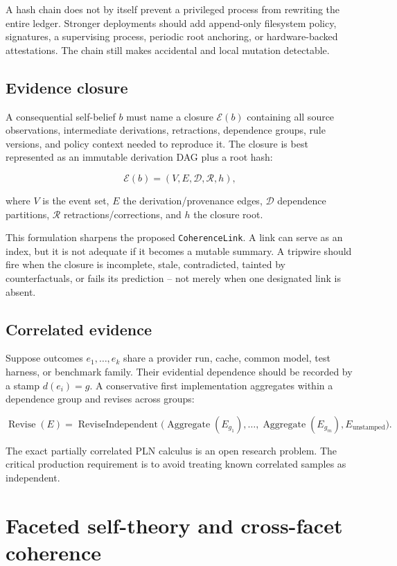 \documentclass[11pt,oneside]{report}
\begin{document}
A hash chain does not by itself prevent a privileged process from rewriting the entire ledger. Stronger deployments should add append-only filesystem policy, signatures, a supervising process, periodic root anchoring, or hardware-backed attestations. The chain still makes accidental and local mutation detectable.

\section{Evidence closure}

A consequential self-belief $b$ must name a closure $\mathcal{E}(b)$ containing all source observations, intermediate derivations, retractions, dependence groups, rule versions, and policy context needed to reproduce it. The closure is best represented as an immutable derivation DAG plus a root hash:

\[
\mathcal{E}(b)=(V,E,\mathcal{D},\mathcal{R},h),
\]

where $V$ is the event set, $E$ the derivation/provenance edges, $\mathcal{D}$ dependence partitions, $\mathcal{R}$ retractions/corrections, and $h$ the closure root.

This formulation sharpens the proposed \texttt{CoherenceLink}. A link can serve as an index, but it is not adequate if it becomes a mutable summary. A tripwire should fire when the closure is incomplete, stale, contradicted, tainted by counterfactuals, or fails its prediction -- not merely when one designated link is absent.

\section{Correlated evidence}

Suppose outcomes $e_1,\ldots,e_k$ share a provider run, cache, common model, test harness, or benchmark family. Their evidential dependence should be recorded by a stamp $d(e_i)=g$. A conservative first implementation aggregates within a dependence group and revises across groups:

\[
\operatorname{Revise}(E)=
\operatorname{ReviseIndependent}
\bigl(\operatorname{Aggregate}(E_{g_1}),\ldots,
      \operatorname{Aggregate}(E_{g_m}),E_{\mathrm{unstamped}}\bigr).
\]

The exact partially correlated PLN calculus is an open research problem. The critical production requirement is to avoid treating known correlated samples as independent.

\chapter{Faceted self-theory and cross-facet coherence}
\end{document}
